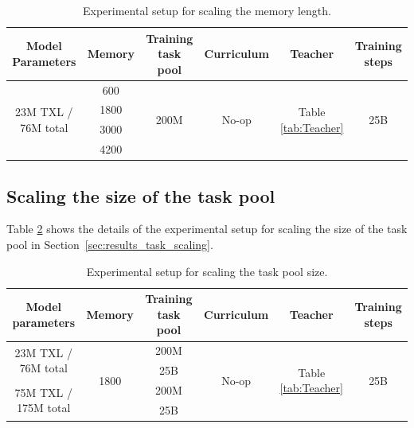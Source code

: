 \begin{table}[h!]
  \begin{center}
    \caption{Experimental setup for scaling the memory length.}
    \begin{tabular}{c|c|c|c|c|c}
    \label{tab:memory-scaling}
      Model Parameters & Memory & Training task pool & Curriculum & Teacher & Training steps \\
      \hline
      \multirow{4}{*}{23M TXL / 76M total} & 600 & \multirow{4}{*}{200M} & \multirow{4}{*}{No-op} & \multirow{4}{*}{Table \ref{tab:Teacher}} & \multirow{4}{*}{25B}\\
      & 1800 &&&&\\
      & 3000 &&&&\\
      & 4200 &&&&\\
    \end{tabular}
  \end{center}
\end{table}

\subsection{Scaling the size of the task pool}
\label{app:task-scaling}
Table \ref{tab:task-scaling} shows the details of the experimental setup for scaling the size of the task pool in Section~\ref{sec:results_task_scaling}. 

\begin{table}[h!]
  \begin{center}
    \caption{Experimental setup for scaling the task pool size.}
    \begin{tabular}{c|c|c|c|c|c}
    \label{tab:task-scaling}
      Model parameters & Memory & Training task pool & Curriculum & Teacher & Training steps \\
      \hline
      \multirow{2}{*}{23M TXL / 76M total} & \multirow{4}{*}{1800} & 200M & \multirow{4}{*}{No-op} & \multirow{4}{*}{Table \ref{tab:Teacher}} & \multirow{4}{*}{25B}\\
      && 25B &&&\\
      \multirow{2}{*}{75M TXL / 175M total} &  & 200M & & & \\
      && 25B &&&\\
    \end{tabular}
  \end{center}
\end{table}


